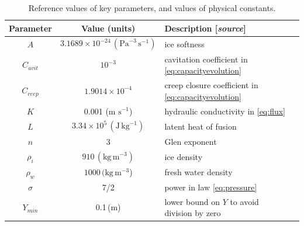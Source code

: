 \documentclass[11pt]{amsart}
\newcommand{\Cavit}{C_{avit}}
\newcommand{\Creep}{C_{reep}}
\begin{document}
\begin{table}[ht]
  \centering
  \caption{Reference values of key parameters, and values of physical constants.}
  \begin{tabular}{ccll}
    \textbf{Parameter} & \textbf{Value (units)} & \textbf{Description [\emph{source}]}\\
    \hline
    $A$ & $3.1689\times 10^{-24}\,(\text{Pa}^{-3}\,\text{s}^{-1})$ & ice softness \citep{EISMINT96} \\
    $\Cavit$ & $10^{-3}$ & cavitation coefficient in \eqref{eq:capacityevolution} \\
    $\Creep$ & $1.9014\times 10^{-4}$ & creep closure coefficient in \eqref{eq:capacityevolution} \\
    $K$ & 0.001 (m $\text{s}^{-1}$) & hydraulic conductivity in \eqref{eq:flux}  \\
    $L$ & $3.34\times 10^5 \,(\text{J}\,\text{kg}^{-1})$ & latent heat of fusion \citep{GreveBlatter2009} \\
    $n$ & 3 & Glen exponent \citep{EISMINT96} \\
    $\rho_i$ & $910\,(\text{kg}\,\text{m}^{-3})$ & ice density \citep{GreveBlatter2009} \\
    $\rho_w$ & $1000\,(\text{kg}\,\text{m}^{-3}$) & fresh water density \citep{GreveBlatter2009}  \\
    $\sigma$ & 7/2 & power in law \eqref{eq:pressure} \citep{FlowersClarke2002_theory} \\
    $Y_{min}$ & 0.1\,(m) & lower bound on $Y$ to avoid division by zero \\
    \hline
  \end{tabular}
 \label{tab:referenceconstants}
\end{table}
\end{document}
